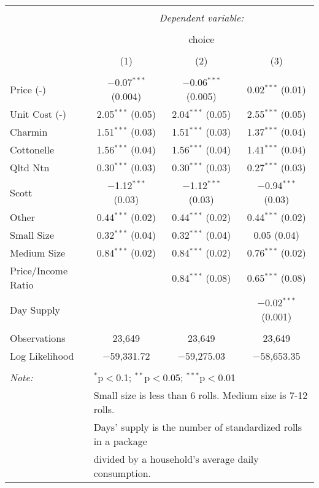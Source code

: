 
\begin{table}[!htbp] \centering 
  \caption{} 
  \label{tab:mnlDallasBaseline} 
\begin{tabular}{@{\extracolsep{5pt}}lccc} 
\\[-1.8ex]\hline 
\hline \\[-1.8ex] 
 & \multicolumn{3}{c}{\textit{Dependent variable:}} \\ 
\cline{2-4} 
\\[-1.8ex] & \multicolumn{3}{c}{choice} \\ 
\\[-1.8ex] & (1) & (2) & (3)\\ 
\hline \\[-1.8ex] 
 Price (-) & $-$0.07$^{***}$ (0.004) & $-$0.06$^{***}$ (0.005) & 0.02$^{***}$ (0.01) \\ 
  Unit Cost (-) & 2.05$^{***}$ (0.05) & 2.04$^{***}$ (0.05) & 2.55$^{***}$ (0.05) \\ 
  Charmin & 1.51$^{***}$ (0.03) & 1.51$^{***}$ (0.03) & 1.37$^{***}$ (0.04) \\ 
  Cottonelle & 1.56$^{***}$ (0.04) & 1.56$^{***}$ (0.04) & 1.41$^{***}$ (0.04) \\ 
  Qltd Ntn & 0.30$^{***}$ (0.03) & 0.30$^{***}$ (0.03) & 0.27$^{***}$ (0.03) \\ 
  Scott & $-$1.12$^{***}$ (0.03) & $-$1.12$^{***}$ (0.03) & $-$0.94$^{***}$ (0.03) \\ 
  Other & 0.44$^{***}$ (0.02) & 0.44$^{***}$ (0.02) & 0.44$^{***}$ (0.02) \\ 
  Small Size & 0.32$^{***}$ (0.04) & 0.32$^{***}$ (0.04) & 0.05 (0.04) \\ 
  Medium Size & 0.84$^{***}$ (0.02) & 0.84$^{***}$ (0.02) & 0.76$^{***}$ (0.02) \\ 
  Price/Income Ratio &  & 0.84$^{***}$ (0.08) & 0.65$^{***}$ (0.08) \\ 
  Day Supply &  &  & $-$0.02$^{***}$ (0.001) \\ 
 \hline \\[-1.8ex] 
Observations & 23,649 & 23,649 & 23,649 \\ 
Log Likelihood & $-$59,331.72 & $-$59,275.03 & $-$58,653.35 \\ 
\hline 
\hline \\[-1.8ex] 
\textit{Note:}  & \multicolumn{3}{l}{$^{*}$p$<$0.1; $^{**}$p$<$0.05; $^{***}$p$<$0.01} \\ 
 & \multicolumn{3}{l}{Small size is less than 6 rolls. Medium size is 7-12 rolls. } \\ 
 & \multicolumn{3}{l}{Days' supply is the number of standardized rolls in a package} \\ 
 & \multicolumn{3}{l}{divided by a household's average daily consumption.} \\ 
\end{tabular} 
\end{table} 
